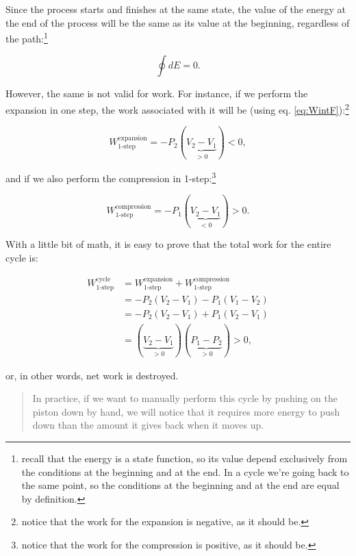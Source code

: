 \documentclass[
]{book}
\theoremstyle{definition}
\theoremstyle{definition}
\theoremstyle{definition}
\theoremstyle{remark}
\begin{document}
Since the process starts and finishes at the same state, the value of the energy at the end of the process will be the same as its value at the beginning, regardless of the path:\footnote{recall that the energy is a state function, so its value depend exclusively from the conditions at the beginning and at the end. In a cycle we're going back to the same point, so the conditions at the beginning and at the end are equal by definition.}

\begin{equation}
  \oint dE=0.
  \label{eq:de0}
\end{equation}

However, the same is not valid for work. For instance, if we perform the expansion in one step, the work associated with it will be (using eq. \eqref{eq:WintF}):\footnote{notice that the work for the expansion is negative, as it should be.}

\begin{equation}
  W^{\text{expansion}}_{\text{1-step}}=-P_2(\underbrace{V_2-V_1}_{>0})<0,
  \label{eq:Wexp1}
\end{equation}

and if we also perform the compression in 1-step:\footnote{notice that the work for the compression is positive, as it should be.}

\begin{equation}
  W^{\text{compression}}_{\text{1-step}}=-P_1(\underbrace{V_2-V_1}_{<0})>0.
  \label{eq:Wcomp1}
\end{equation}

With a little bit of math, it is easy to prove that the total work for the entire cycle is:

\begin{equation}
\begin{aligned}
W^{\text{cycle}}_{\text{1-step}} {} & =  W^{\text{expansion}}_{\text{1-step}}+W^{\text{compression}}_{\text{1-step}} \\
 & = -P_2(V_2-V_1)-P_1(V_1-V_2) \\
 & = -P_2(V_2-V_1)+P_1(V_2-V_1) \\
 & = (\underbrace{V_2-V_1}_{>0})(\underbrace{P_1-P_2}_{>0}) > 0,
\end{aligned}
  \label{eq:Wtot1}
\end{equation}

or, in other words, net work is destroyed.

\begin{quote}
In practice, if we want to manually perform this cycle by pushing on the piston down by hand, we will notice that it requires more energy to push down than the amount it gives back when it moves up.
\end{quote}
\end{document}

